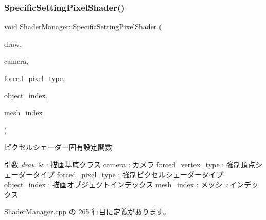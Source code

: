 \mbox{\label{class_shader_manager_a1158156785098fe426dd514e4c2a97c1}} 
\subsubsection{\texorpdfstring{Specific\+Setting\+Pixel\+Shader()}{SpecificSettingPixelShader()}}
{\footnotesize\ttfamily void Shader\+Manager\+::\+Specific\+Setting\+Pixel\+Shader (\begin{DoxyParamCaption}\item[{\mbox{\hyperlink{class_draw_base}{Draw\+Base}} $\ast$}]{draw,  }\item[{\mbox{\hyperlink{class_camera}{Camera}} $\ast$}]{camera,  }\item[{\mbox{\hyperlink{class_shader_manager_a7d15d773b3c6a99dd7086c45c8b0be5f}{Pixel\+Shader\+Type}}}]{forced\+\_\+pixel\+\_\+type,  }\item[{unsigned}]{object\+\_\+index,  }\item[{unsigned}]{mesh\+\_\+index }\end{DoxyParamCaption})\hspace{0.3cm}{\ttfamily [private]}}



ピクセルシェーダー固有設定関数 


\begin{DoxyParams}{引数}
{\em draw} & \+: 描画基底クラス camera \+: カメラ forced\+\_\+vertex\+\_\+type \+: 強制頂点シェーダータイプ forced\+\_\+pixel\+\_\+type \+: 強制ピクセルシェーダータイプ object\+\_\+index \+: 描画オブジェクトインデックス mesh\+\_\+index \+: メッシュインデックス \\
\hline
\end{DoxyParams}


 Shader\+Manager.\+cpp の 265 行目に定義があります。

\mbox{\label{class_shader_manager_a2433c0715142fd310a497e080f7d0ddb}} 
